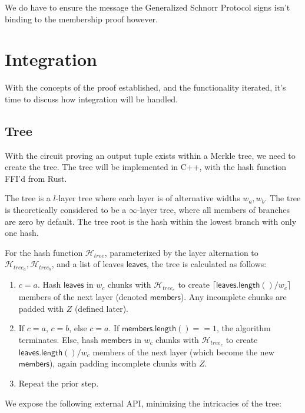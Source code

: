 \documentclass[]{article}
\begin{document}
We do have to ensure the message the Generalized Schnorr Protocol signs isn't binding to the membership proof however.

\newpage

\section{Integration}

With the concepts of the proof established, and the functionality iterated, it's time to discuss how integration will be handled.

\subsection{Tree}

With the circuit proving an output tuple exists within a Merkle tree, we need to create the tree. The tree will be implemented in C++, with the hash function FFI'd from Rust.

The tree is a $l$-layer tree where each layer is of alternative widths $w_a, w_b$. The tree is theoretically considered to be a $\infty$-layer tree, where all members of branches are zero by default. The tree root is the hash within the lowest branch with only one hash.

For the hash function $\mathcal{H}_{tree}$, parameterized by the layer alternation to $\mathcal{H}_{tree_a}, \mathcal{H}_{tree_b}$, and a list of leaves $\mathsf{leaves}$, the tree is calculated as follows:

\begin{enumerate}
	\item $c = a$. Hash $\mathsf{leaves}$ in $w_c$ chunks with $\mathcal{H}_{tree_c}$ to create $\lceil \mathsf{leaves.length()} / w_c \rceil$ members of the next layer (denoted $\mathsf{members}$). Any incomplete chunks are padded with $Z$ (defined later).
	\item If $c = a$, $c = b$, else $c = a$. If $\mathsf{members.length()} == 1$, the algorithm terminates. Else, hash $\mathsf{members}$ in $w_c$ chunks with $\mathcal{H}_{tree_c}$ to create $\mathsf{leaves.length()} / w_c$ members of the next layer (which become the new $\mathsf{members}$), again padding incomplete chunks with $Z$.
	\item Repeat the prior step.
\end{enumerate}

We expose the following external API, minimizing the intricacies of the tree:
\end{document}
